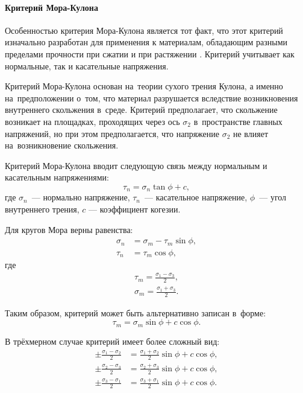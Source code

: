 \documentclass[thesis.tex]{subfiles}
\begin{document}
\paragraph{Критерий Мора-Кулона}
Особенностью критерия Мора-Кулона является тот факт, что этот критерий изначально разработан для применения к
материалам, обладающим разными пределами прочности при сжатии и при растяжении \cite{надаи1954пластичность,coulomb1776essai}.
Критерий учитывает как нормальные, так и касательные напряжения.

Критерий Мора-Кулона основан на~теории сухого трения Кулона, а именно на~предположении о~том, что
материал разрушается вследствие возникновения внутреннего скольжения в~среде. Критерий предполагает, что скольжение
возникает на
площадках, проходящих через ось $\sigma_2$ в~пространстве главных напряжений, но при этом предполагается, что напряжение
$\sigma_2$ не влияет на~возникновение скольжения.

Критерий Мора-Кулона вводит следующую связь между нормальным и касательным напряжениями:
\begin{equation}
    \tau_n = \sigma_n \tan \phi + c,
    \label{критерия_мора}
\end{equation}
где $\sigma_n$~--- нормально напряжение, $\tau_n$~--- касательное напряжение, $\phi$~--- угол внутреннего трения, $c$
--- коэффициент когезии.

Для кругов Мора верны равенства:
\begin{align}
    \sigma_n &= \sigma_m - \tau_m \sin \phi, \nonumber \\
    \tau_n  &= \tau_m \cos \phi,
\end{align}
где
\begin{align}
    \tau_m = \frac{\sigma_1-\sigma_3}{2}, \nonumber \\
    \sigma_m = \frac{\sigma_1+\sigma_3}{2}.
\end{align}

Таким образом, критерий может быть альтернативно записан в~форме:
\begin{equation}
    \tau_m = \sigma_m\sin \phi + c\cos \phi.
\end{equation}

В трёхмерном случае критерий имеет более сложный вид:
\begin{align}
    \pm\frac{\sigma_1-\sigma_2}{2} &= \frac{\sigma_1+\sigma_2}{2}\sin\phi + c\cos \phi, \nonumber \\
    \pm\frac{\sigma_2-\sigma_3}{2} &= \frac{\sigma_2+\sigma_3}{2}\sin\phi + c\cos \phi, \nonumber \\
    \pm\frac{\sigma_3-\sigma_1}{2} &= \frac{\sigma_3+\sigma_1}{2}\sin\phi + c\cos \phi.
    \label{трёхмерный_критерий_кулона}
\end{align}
\end{document}
